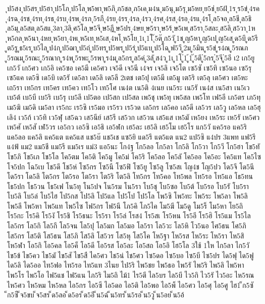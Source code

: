 {ุป5สง
ุป5สร
ุป5ฮา
ุป5โภ
ุป5โล
ุพ5พา
ุพ5ภิ
ุภ5ชล
ุภ5เค
ุม4น
ุม5นุ
ุม5รุ
ุม5หย
ุย5ช่
ุย5ฝ้
ุ1ร
ุร5ข่
ุ4รค
ุ4รฉ
ุ4รช
ุ4รท
ุ4รธ
ุ4รบ
ุ4รพ
ุ4รภ
ุ5รภี
ุ4รย
ุ4รร
ุ4รล
ุ4รว
ุ4รศ
ุ4รส
ุ4รอ
ุ4รแ
ุ4รโ
ุล5จอ
ุล5ชี
ุล5ธิ
ุล5มุ
ุล5สต
ุล5สแ
ุ3ลา
ุ3ลิ
ุศ5โล
ุษ5จี
ุษ5ฎี
ุษ5ปร
ุ4ษย
ุษ5รา
ุษ5ร้
ุษ5เพ
ุส5รา
ุ5สละ
ุส5ลิ
ุส5วา
ุ1ห
ุห5กล
ุห5นา
ุ4หย
ุห5ยา
ุ4หเ
ุห5เท
ุห5เส
ุ4หโ
ุห5โย
ุ1เ
ุ1โ
ุ๊5ต๊
ูก5วั
ู1ช
ูญ5หา
ูญ5เป
ูญ5เส
ูด5บึ
ูด5รี
ูต5รู
ูธ5เร
ูบ5ไล
ูป4ก
ูป5ฌา
ูป5ถ่
ูป5ทร
ูป5พร
ูป5ร่
ูป5แบ
ูป5โฉ
ูฟ5วี
ู2ม
ู5มิน
ูร5ข่
ูร4ณ
ู5รณภ
ู5รณม
ู5รณะ
ู5รณาก
ูร4พ
ู5รพะ
ู5รพา
ูร4ม
ูล5กร
ูล5ค่
ู3ลั
ูส4ว
ู1เ
ู1โ
ู่1
ู้1
ู๊5ตึ
ู๋5กร
ู๋5จี
ู๋5อี
เ2
เก5ยู
เก5วั
เก5ศว
เก5อิ
เค5ซอ
เค5มี
เค5ศว
เจ5ดี
เจ5นี
เ4จร
เจ5ลิ
เจ5โต
เซ5ซั
เซ5ทิ
เซ5นอ
เซ5รุ
เซ5แค
เด5ซิ
เด5บิ
เด5รั
เด5ลา
เด5ลิ
เด5ลี
2เตช
เต5ปุ
เต5มี
เต5มู
เต5ริ
เต5ลุ
เต5ศว
เต5หะ
เถ5รา
เท5กร
เท5คร
เท5คว
เท5โว
เท5โศ
เน4ต
เน5ติ
4เนย
เน5ระ
เน5รั
เน4ส
เน5สา
เน5เว
เบ5ต้
เบ5บี
เบ5ริ
เบ5รุ
เบ5ลี
เป5ตอ
เป5สก
เป5สล
เพ5ชุ
เพ5ทุ
เพ5สล
เพ5โท
เฟ5อี
เภ5ตร
เภ5ทุ
เม5ฆิ
เม5ดิ
เม5ลา
เร5กะ
เร5ซิ
เร5มอ
เร5รว
เร5วด
เล5กร
เล5คอ
เล5ดี
เล5วร
เล5วู
เล5หล
เล5ฮุ
เลิ4
เว5ก้
เว5ทิ
เว5ฬุ
เส5ฉว
เส5นีย์
เส5รี
เส5วก
เส5วน
เส5แส
เห5มั
เห5ยง
เห5ระ
เห5รั
เห5ศว
เห5ศั
เห5สั
เฬ5วร
เอ5กว
เอ5ซิ
เอ5ธิ
เอ5ฬก
เฮ5ละ
เฮ5ลิ
เฮ5โม
เฮ5โร
แก5วั
แค5รอ
แค5ริ
แค5ลอ
แค5ลิ
แค5แต
แค5แส
แช5บ๊
แช5เช
แซ5ยิ
แด5รี
แต5แต
แน2
แป5ซิ
แ4ปร
3แพท
แฟ5รี
แ4ฟ้
แม2
แม5ชี
แม5รี
แม5เร
แม่3
แอ5นะ
โก4ฐ
โก5ลอ
โก5ลา
โก5ลิ
โก5วา
โก5วี
โก5ฮา
โข5ทั
โข5ภิ
โข5เภ
โข5โล
โค5ตม
โค5ติ
โค5มู
โค5ม่
โค5ริ
โค5ลอ
โค5ลั
โค5ออ
โค5อะ
โค5แท
โค5ไซ
โจ5ปก
โฉ5เบ
โช5ดึ
โช5ห่
โซ5กร
โซ5นี
โซ5ฟิ
โซ5ยู
โซ5ลู
โซ5สเ
โญ4ช
โญ5ปว
โด5จี
โด5นี
โด5รา
โด5ลิ
โต5กร
โต5รอ
โต5รา
โต5ริ
โต5ลิ
โท5กร
โท5คอ
โท5พล
โท5รอ
โท5แอ
โธ5ทน
โธ5ปก
โธ5วน
โธ5เฟ
โน5ทุ
โน5ปจ
โน5รม
โน5รา
โบ5ชุ
โบ5ซอ
โบ5ต้
โบ5รอ
โบ5รั
โบ5รา
โบ5ลิ
โบ5ล่
โบ5ไฮ
โป5กส
โป5ลิ
โป5แล
โป5โป
โป5โล
โพ5ซิ
โพ5ทะ
โพ5ระ
โพ5ลา
โพ5ลิ
โพ5ลี
โพ5หา
โพ5แท
โพ5ไซ
โฟ5กร
โฟ5นี
โภ5คิ
โภ5ไค
โม5ฆี
โม5ดู
โม5ร็
โม5หา
โย5ถิ
โร5กะ
โร5คิ
โร5งั
โร5ชิ
โร5ธนะ
โร5รา
โร5ล่
โรส4
โร5สเ
โร5หน
โร5อี
โร5ฮิ
โร5แม
โร5ไล
โล5กร
โล5กิ
โล5กี
โล5จน
โล5ปุ
โล5มก
โล5มอ
โล5รา
โล5วะ
โล5หิ
โว5นอ
โศ5ธน
โศ5ภิ
โส5กร
โส5ติ
โส5ธน
โส5ภิ
โส5ลิ
โส5วร
โส5หุ
โส5โค
โห5ฐา
โห5รส
โห5ระ
โห5รา
โห5สิ
โห5ฬา
โอ5กิ
โอ5คล
โอ5ค็
โอ5ดี
โอ5รส
โอ5ละ
โอ5สถ
โอ5อิ
โฮ5โล
3ใช้
1ให
ไก5ลา
ไก5วั
ไข5ข้
ไข5คว
ไข5มั
ไข5สั
ไข5สื
ไค5ศว
ไช5น่
ไช5ศว
ไซ5ดอ
ไซ5บอ
ไซ5บี
ไซ5ปร
ได5ฟุ
ได5ฟู
ได5ลิ
ได5ออ
ไท5ฟอ
ไท5รอ
ไท5แท
3ไนย
ไป5ริ
ไพ5ชย
ไพ5ธอ
ไพ5รั
ไพ5ริ
ไพ5ลิ
ไพ5หา
ไพ5โร
ไพ5โอ
ไฟ5แช
ไฟ5แน
ไภ5ริ
ไม5ถิ
ไม้1
ไร5ตี
ไล5บร
ไล5บี
ไว5กิ
ไว5รั
ไว5อะ
ไห5รณ
ไห5ศว
ไห5หม
ไห5หล
ไอ5กร
ไอ5ซี
ไอ5ดอ
ไอ5ติ
ไอ5พอ
ไอ5พ็
ไอ5ศว
ไอ5ศุ
ไอ5ศู
ไฮ1
็ก5ซั
็ก5ซี
็จ5ขบ
็จ5สร
็ด5ลอ
็ด5อร
็ด5อึ
็น5ฉ่
็น5ทร
็น5รอ
็น5วู
็น5อย
็น5อ้
}

